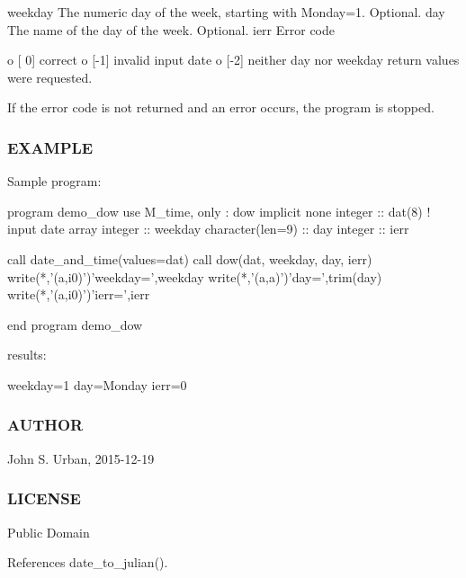 weekday The numeric day of the week, starting with Monday=1. Optional. day The name of the day of the week. Optional. ierr Error code \begin{DoxyVerb}     o [ 0] correct
     o [-1] invalid input date
     o [-2] neither day nor weekday return values were
            requested.

     If the error code is not returned and an error occurs,
     the program is stopped.
\end{DoxyVerb}


\subsubsection*{E\+X\+A\+M\+P\+LE}

\begin{DoxyVerb}Sample program:

 program demo_dow
 use M_time, only : dow
 implicit none
 integer          :: dat(8)     ! input date array
 integer          :: weekday
 character(len=9) :: day
 integer          :: ierr

   call date_and_time(values=dat)
   call dow(dat, weekday, day, ierr)
   write(*,'(a,i0)')'weekday=',weekday
   write(*,'(a,a)')'day=',trim(day)
   write(*,'(a,i0)')'ierr=',ierr

 end program demo_dow

results:

 weekday=1
 day=Monday
 ierr=0
\end{DoxyVerb}
 \subsubsection*{A\+U\+T\+H\+OR}

John S. Urban, 2015-\/12-\/19 \subsubsection*{L\+I\+C\+E\+N\+SE}

Public Domain 

References date\+\_\+to\+\_\+julian().

